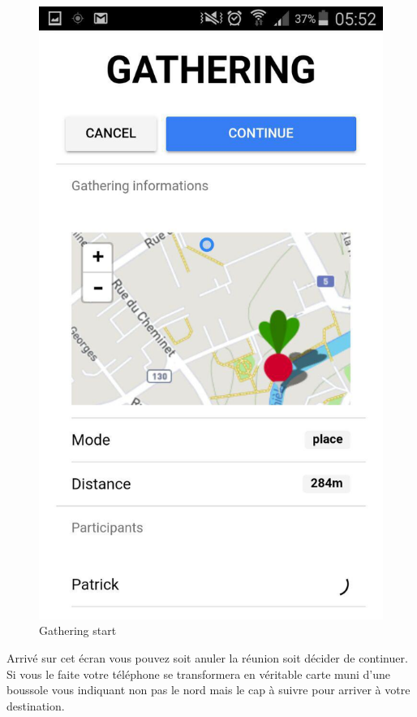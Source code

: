 \documentclass[french]{article}
\begin{document}
	\begin{figure}[H]
		\centering
		\includegraphics[scale=0.4]{../screenshot/screenshot-gathering-start}
		\caption{Gathering start}
		\label{Gathering start}
	\end{figure} 
	Arrivé sur cet écran vous pouvez soit anuler la réunion soit décider de continuer. Si vous le faite votre téléphone se transformera en véritable carte muni d'une boussole vous indiquant non pas le nord mais le cap à suivre pour arriver à votre destination.
\end{document}
